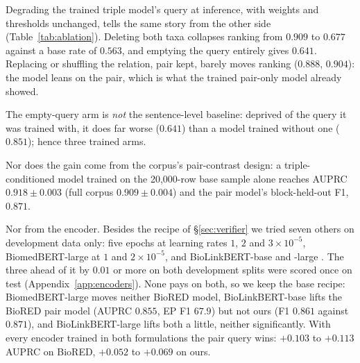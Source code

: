 \documentclass[11pt]{article}
\begin{document}
\begin{table}[t]\centering\small
\setlength{\tabcolsep}{4pt}
\caption{Degrading segment~A of the trained triple-conditioned model at inference, weights and its
own block-held-out thresholds unchanged. Base rate $0.563$. Per-seed standard deviations on AUPRC
are $\le 0.027$.}
\label{tab:ablation}
\end{table}

Degrading the trained triple model's query at inference, with weights and thresholds unchanged,
tells the same story from the other side (Table~\ref{tab:ablation}). Deleting both taxa collapses
ranking from $0.909$ to $0.677$ against a base rate of $0.563$, and emptying the query entirely gives
$0.641$. Replacing or shuffling the relation, pair kept, barely moves ranking ($0.888$, $0.904$): the
model leans on the pair, which is what the trained pair-only model already showed.

The empty-query arm is \emph{not} the sentence-level baseline: deprived of the query it was trained
with, it does far worse ($0.641$) than a model trained without one ($0.851$); hence three trained arms.

Nor does the gain come from the corpus's pair-contrast design: a triple-conditioned model trained on
the 20{,}000-row base sample alone reaches AUPRC $0.918 \pm 0.003$ (full corpus $0.909 \pm 0.004$)
and the pair model's block-held-out F1, $0.871$.

Nor from the encoder. Besides the recipe of \S\ref{sec:verifier} we tried seven others on
development data only: five epochs at learning rates $1$, $2$ and $3\times10^{-5}$, BiomedBERT-large
at $1$ and $2\times10^{-5}$, and BioLinkBERT-base and -large \citep{yasunaga2022linkbert}. The three
ahead of it by $0.01$ or more on both development splits were scored once on test
(Appendix~\ref{app:encoders}). None pays on both, so we keep the base recipe: BiomedBERT-large moves
neither BioRED model, BioLinkBERT-base lifts the BioRED pair model (AUPRC $0.855$, EP F1 $67.9$) but
not ours (F1 $0.861$ against $0.871$), and BioLinkBERT-large lifts both a little, neither
significantly. With every encoder trained in both formulations the pair query wins: $+0.103$ to
$+0.113$ AUPRC on BioRED, $+0.052$ to $+0.069$ on ours.
\end{document}
